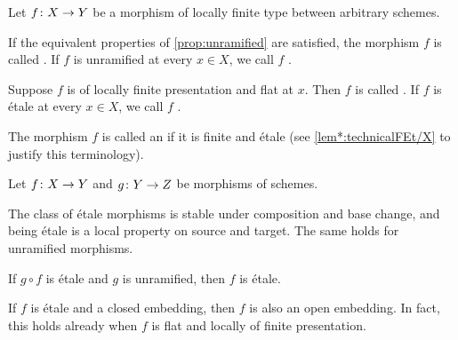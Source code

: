 \begin{defi}\label{def:etale}
	Let $f\colon X\morphism Y$ be a morphism of locally finite type between arbitrary schemes.
	\begin{alphanumerate}
		\item If the equivalent properties of \cref{prop:unramified} are satisfied, the morphism $f$ is called . If $f$ is unramified at every $x\in X$, we call $f$ .
		\item Suppose $f$ is of locally finite presentation and flat at $x$. Then $f$ is called . If $f$ is étale at every $x\in X$, we call $f$ .
		\item The morphism $f$ is called an  if it is finite and étale (see \cref{lem*:technicalFEt/X} to justify this terminology).
	\end{alphanumerate}
\end{defi}
\begin{fact}\label{fact:etaleProperties}
	Let $f\colon X\morphism Y$ and $g\colon Y\morphism Z$ be morphisms of schemes.
	\begin{alphanumerate}
		\item The class of étale morphisms is stable under composition and base change, and being étale is a local property on source and target. The same holds for unramified morphisms.
		\item If $g\circ f$ is étale and $g$ is unramified, then $f$ is étale.
		\item If $f$ is étale and a closed embedding, then $f$ is also an open embedding. In fact, this holds already when $f$ is flat and locally of finite presentation.
	\end{alphanumerate}
\end{fact}
